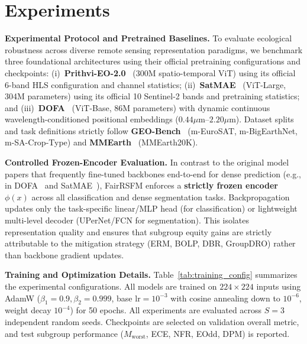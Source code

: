 \documentclass[10pt,twocolumn,letterpaper]{article}
\newcommand{\method}{FairRSFM\xspace}
\begin{document}
\section{Experiments}

\noindent \textbf{Experimental Protocol and Pretrained Baselines.}
To evaluate ecological robustness across diverse remote sensing representation paradigms, we benchmark three foundational architectures using their official pretraining configurations and checkpoints:
(i)~\textbf{Prithvi-EO-2.0}~\cite{prithvi2} (300M spatio-temporal ViT) using its official 6-band HLS configuration and channel statistics;
(ii)~\textbf{SatMAE}~\cite{satmae} (ViT-Large, 304M parameters) using its official 10 Sentinel-2 bands and pretraining statistics; and
(iii)~\textbf{DOFA}~\cite{dofa} (ViT-Base, 86M parameters) with dynamic continuous wavelength-conditioned positional embeddings ($0.44\mu\text{m}\text{--}2.20\mu\text{m}$).
Dataset splits and task definitions strictly follow \textbf{GEO-Bench}~\cite{geobench} (m-EuroSAT, m-BigEarthNet, m-SA-Crop-Type) and \textbf{MMEarth}~\cite{mmearth} (MMEarth20K).

\smallskip
\noindent \textbf{Controlled Frozen-Encoder Evaluation.}
In contrast to the original model papers that frequently fine-tuned backbones end-to-end for dense prediction (e.g., in DOFA~\cite{dofa} and SatMAE~\cite{satmae}), \method enforces a \textbf{strictly frozen encoder} $\phi(x)$ across all classification and dense segmentation tasks. Backpropagation updates only the task-specific linear/MLP head (for classification) or lightweight multi-level decoder (UPerNet/FCN for segmentation). This isolates representation quality and ensures that subgroup equity gains are strictly attributable to the mitigation strategy (ERM, BOLP, DBR, GroupDRO) rather than backbone gradient updates.

\smallskip
\noindent \textbf{Training and Optimization Details.}
Table~\ref{tab:training_config} summarizes the experimental configurations. All models are trained on $224\times224$ inputs using AdamW ($\beta_1=0.9, \beta_2=0.999$, base $\text{lr}=10^{-3}$ with cosine annealing down to $10^{-6}$, weight decay $10^{-4}$) for 50 epochs. All experiments are evaluated across $S=3$ independent random seeds. Checkpoints are selected on validation overall metric, and test subgroup performance ($M_{\mathrm{worst}}$, ECE, NFR, EOdd, DPM) is reported.
\end{document}
